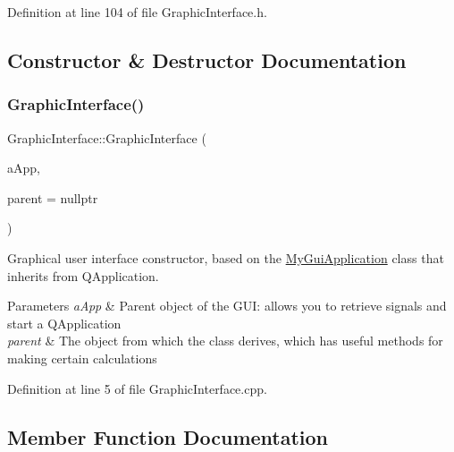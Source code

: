 Definition at line 104 of file Graphic\+Interface.\+h.



\subsection{Constructor \& Destructor Documentation}
\mbox{\label{class_graphic_interface_a7e6e90bcb56ad51c9b0cfcfb178a0e4e}} 
\subsubsection{\texorpdfstring{Graphic\+Interface()}{GraphicInterface()}}
{\footnotesize\ttfamily Graphic\+Interface\+::\+Graphic\+Interface (\begin{DoxyParamCaption}\item[{\hyperlink{class_my_gui_application}{My\+Gui\+Application} $\ast$}]{a\+App,  }\item[{Q\+Object $\ast$}]{parent = {\ttfamily nullptr} }\end{DoxyParamCaption})\hspace{0.3cm}{\ttfamily [explicit]}}



Graphical user interface constructor, based on the \hyperlink{class_my_gui_application}{My\+Gui\+Application} class that inherits from Q\+Application. 


\begin{DoxyParams}{Parameters}
{\em a\+App} & Parent object of the G\+UI\+: allows you to retrieve signals and start a Q\+Application \\
\hline
{\em parent} & The object from which the class derives, which has useful methods for making certain calculations \\
\hline
\end{DoxyParams}


Definition at line 5 of file Graphic\+Interface.\+cpp.



\subsection{Member Function Documentation}
\mbox{\label{class_graphic_interface_aeea1ac14cde1f705f60b9a62735f137c}} 
